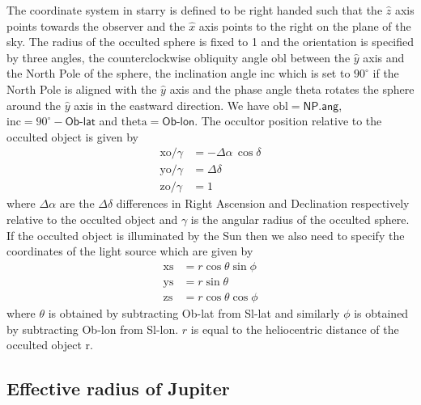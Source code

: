 \documentclass[modern]{aastex62}
\begin{document}
The coordinate system in \textsf{starry} is defined to be right handed such that the $\hat{z}$
axis points towards the observer and the $\hat{x}$ axis points to the right on the plane of the sky.
The radius of the occulted sphere is fixed to 1 and the orientation is specified by three angles,
the counterclockwise obliquity angle \textsf{obl} between the $\hat{y}$ axis and the North Pole of the sphere, the inclination angle \textsf{inc} which is set to $90^\circ$ if the North Pole is aligned with the $\hat{y}$ axis and the phase angle \textsf{theta} rotates the sphere around the $\hat{y}$ axis in the eastward direction.
We have $\mathrm{obl}=\textsf{NP.ang}$, $\mathrm{inc}=90^\circ-\textsf{Ob-lat}$ and
$\mathrm{theta}=\textsf{Ob-lon}$.
The occultor position relative to the occulted object is given by
\begin{align}
    \mathrm{xo}/\gamma&=-\Delta\alpha\,\cos\delta\\
    \mathrm{yo}/\gamma&=\Delta\delta\\
    \mathrm{zo}/\gamma&=1
\end{align}
where $\Delta\alpha$ are the $\Delta\delta$ differences in Right Ascension and Declination respectively relative to the occulted object and $\gamma$ is the angular radius of the occulted sphere.
If the occulted object is illuminated by the Sun then we also need to specify the coordinates of the light source which are given by
\begin{align}
    \mathrm{xs}&=r\cos\theta\sin\phi\\
    \mathrm{ys}&=r\sin\theta\\
    \mathrm{zs}&=r\cos\theta\cos\phi
\end{align}
where $\theta$ is obtained by subtracting \textsf{Ob-lat} from \textsf{Sl-lat} and similarly $\phi$ is obtained by subtracting \textsf{Ob-lon} from \textsf{Sl-lon}.
$r$ is equal to the heliocentric distance of the occulted object \textsf{r}.

\subsection{Effective radius of Jupiter}
\end{document}
